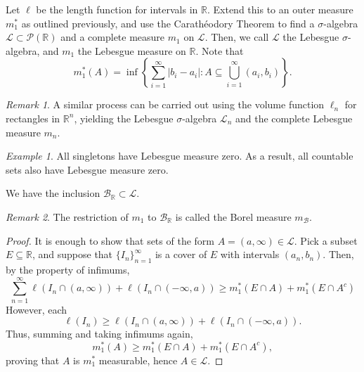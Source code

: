 \documentclass[11pt]{article}
\newcommand{\R}{\mathbb{R}}
\renewcommand{\L}{\mathcal{L}}
\theoremstyle{definition}
\theoremstyle{remark}
\newtheorem*{remark}{Remark}
\newtheorem*{example}{Example}
\numberwithin{equation}{section}
\begin{document}
    \begin{definition}
        Let $\ell$ be the length function for intervals in $\R$. Extend this to an
        outer measure $m_1^*$ as outlined previously, and use the Carath\'eodory
        Theorem to find a $\sigma$-algebra $\L \subset \mathcal{P}(\R)$ and a
        complete measure $m_1$ on $\L$. Then, we call $\L$ the Lebesgue
        $\sigma$-algebra, and $m_1$ the Lebesgue measure on $\R$. Note that \[
            m_1^*(A) = \inf\left\{\sum_{i = 1}^\infty |b_i - a_i|: A \subseteq
            \bigcup_{i = 1}^\infty (a_i, b_i)\right\}.
        \]
        \begin{remark}
            A similar process can be carried out using the volume function $\ell_n$
            for rectangles in $\R^n$, yielding the Lebesgue $\sigma$-algebra $\L_n$
            and the complete Lebesgue measure $m_n$.
        \end{remark}
    \end{definition}

    \begin{example}
        All singletons have Lebesgue measure zero. As a result, all countable sets
        also have Lebesgue measure zero.
    \end{example}

    \begin{theorem}
        We have the inclusion $\mathcal{B}_\R \subset \L$.

        \begin{remark}
            The restriction of $m_1$ to $\mathcal{B}_\R$ is called the Borel measure
            $m_{\mathcal{B}}$.
        \end{remark}
    \end{theorem}
    \begin{proof}
        It is enough to show that sets of the form $A = (a, \infty) \in \L$. Pick a
        subset $E \subseteq \R$, and suppose that $\{I_n\}_{n = 1}^\infty$ is a cover
        of $E$ with intervals $(a_n, b_n)$. Then, by the property of infimums, \[
            \sum_{n = 1}^\infty \ell(I_n \cap (a, \infty)) + \ell(I_n \cap (-\infty,
            a)) \geq m_1^*(E \cap A) + m_1^*(E \cap A^c)
        \] However, each \[
            \ell(I_n) \geq \ell(I_n \cap (a, \infty)) + \ell(I_n \cap (-\infty, a)).
        \] Thus, summing and taking infimums again, \[
            m_1^*(A) \geq m_1^*(E \cap A) + m_1^*(E \cap A^c),
        \] proving that $A$ is $m_1^*$ measurable, hence $A \in \L$.
    \end{proof}
\end{document}
